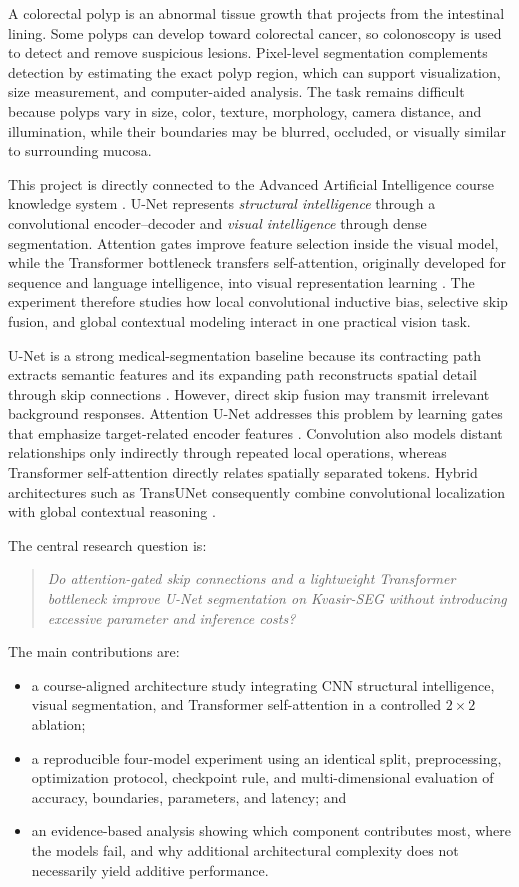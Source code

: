 \documentclass[a4paper,10pt]{article}
\begin{document}
A colorectal polyp is an abnormal tissue growth that projects from the intestinal lining. Some polyps can develop toward colorectal cancer, so colonoscopy is used to detect and remove suspicious lesions. Pixel-level segmentation complements detection by estimating the exact polyp region, which can support visualization, size measurement, and computer-aided analysis. The task remains difficult because polyps vary in size, color, texture, morphology, camera distance, and illumination, while their boundaries may be blurred, occluded, or visually similar to surrounding mucosa.

This project is directly connected to the Advanced Artificial Intelligence course knowledge system \cite{hitsz2026aai}. U-Net represents \emph{structural intelligence} through a convolutional encoder--decoder and \emph{visual intelligence} through dense segmentation. Attention gates improve feature selection inside the visual model, while the Transformer bottleneck transfers self-attention, originally developed for sequence and language intelligence, into visual representation learning \cite{vaswani2017attention}. The experiment therefore studies how local convolutional inductive bias, selective skip fusion, and global contextual modeling interact in one practical vision task.

U-Net is a strong medical-segmentation baseline because its contracting path extracts semantic features and its expanding path reconstructs spatial detail through skip connections \cite{ronneberger2015unet}. However, direct skip fusion may transmit irrelevant background responses. Attention U-Net addresses this problem by learning gates that emphasize target-related encoder features \cite{oktay2018attention}. Convolution also models distant relationships only indirectly through repeated local operations, whereas Transformer self-attention directly relates spatially separated tokens. Hybrid architectures such as TransUNet consequently combine convolutional localization with global contextual reasoning \cite{chen2024transunet}.

The central research question is:
\begin{quote}
\emph{Do attention-gated skip connections and a lightweight Transformer bottleneck improve U-Net segmentation on Kvasir-SEG without introducing excessive parameter and inference costs?}
\end{quote}

The main contributions are:
\begin{itemize}
    \item a course-aligned architecture study integrating CNN structural intelligence, visual segmentation, and Transformer self-attention in a controlled $2\times2$ ablation;
    \item a reproducible four-model experiment using an identical split, preprocessing, optimization protocol, checkpoint rule, and multi-dimensional evaluation of accuracy, boundaries, parameters, and latency; and
    \item an evidence-based analysis showing which component contributes most, where the models fail, and why additional architectural complexity does not necessarily yield additive performance.
\end{itemize}
\end{document}
